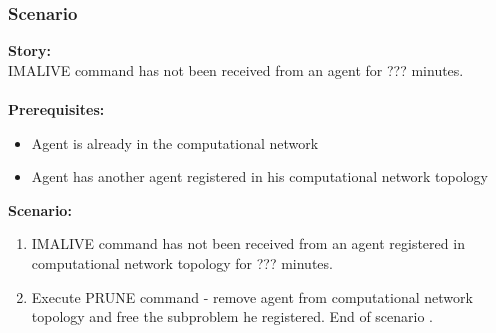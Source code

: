 \documentclass{article}
\begin{document}
\subsubsection{Scenario }
\noindent\textbf{Story:} \\
IMALIVE command has not been received from an agent for ??? minutes. \\\\
\textbf{Prerequisites:}
\begin{itemize}
    \item Agent is already in the computational network
    \item Agent has another agent registered in his computational network topology
\end{itemize}
\textbf{Scenario:}
\begin{enumerate}
    \item IMALIVE command has not been received from an agent registered in computational network topology for ??? minutes.
    \item Execute PRUNE command - remove agent from computational network topology and free the subproblem he registered. End of scenario .
\end{enumerate}
\end{document}
